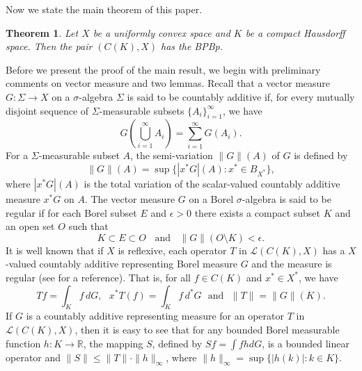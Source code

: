 \documentclass[a4paper]{amsart}
\theoremstyle{plain}
\newtheorem{theorem}{Theorem}[section]
\theoremstyle{definition}
\begin{document}
Now we state the main theorem of this paper.

\begin{theorem}\label{thm}
Let $X$ be a uniformly convex space and $K$ be a compact Hausdorff space. Then the pair $(C(K), X)$ has the BPBp.
\end{theorem}

 Before we present the proof of the main result, we begin with preliminary comments on vector measure and two lemmas.
Recall that a vector measure $G:\Sigma\to X$ on a $\sigma$-algebra $\Sigma$ is said to be countably additive if, for every mutually disjoint sequence of $\Sigma$-measurable subsets $\{A_i\}_{i=1}^\infty$, we have
\[ G\left(\bigcup_{i=1}^\infty A_i\right) = \sum_{i=1}^\infty G(A_i).\]
For a $\Sigma$-measurable subset $A$, the semi-variation $\|G\|(A)$ of $G$  is defined by
\[ \|G\|(A) = \sup\{ |x^*G|(A) : x^*\in B_{X^*}\},\] where $|x^*G|(A)$ is the total variation of the scalar-valued countably additive measure $x^*G$ on $A$. The vector measure $G$ on a Borel $\sigma$-algebra is said to be regular if for each Borel subset $E$ and $\epsilon>0$ there exists a compact subset $K$ and an open set $O$ such that
\[ K\subset E \subset O \ \ \ \ \text{and}\ \ \ \ \|G\|(O\setminus K)<\epsilon.\]
It is well known that if $X$ is reflexive, each operator $T$ in $\mathcal{L}(C(K),X)$ has a $X$-valued countably additive representing Borel measure $G$ and the measure is regular (see \cite[VI. Theorem 1, 5 and Corollary 14]{DU} for a reference). That is, for all $f\in C(K)$ and $x^*\in X^*$, we have
\[ Tf = \int_K f\, dG, \ \  \ x^*T(f) = \int_K f \, d^*G \ \ \ \text{and} \ \ \  \|T\| = \|G\|(K).\]
If $G$ is a countably additive representing measure for an operator $T$ in   $\mathcal{L}(C(K),X)$, then it is easy to see that for any bounded Borel measurable function  $h:K \to \mathbb{R}$, the mapping $S$, defined by $Sf=\int f hdG$, is a bounded linear operator and $\|S\|{\leqslant}\|T\|\cdot \|h\|_\infty$, where $\|h\|_\infty = \sup\{ |h(k)|: k\in K\}$.
\end{document}
